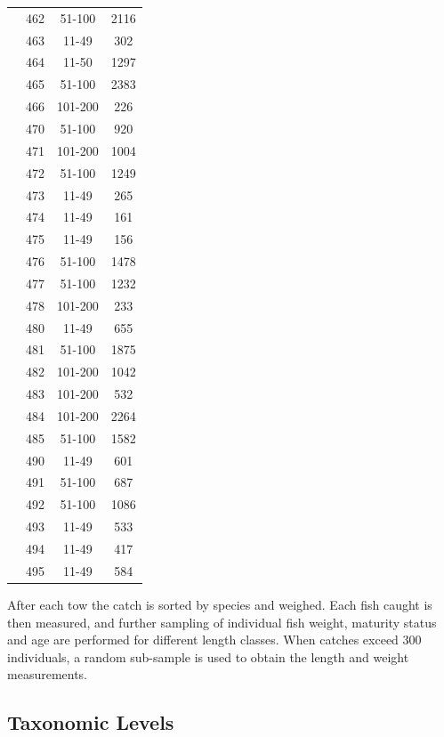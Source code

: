 \documentclass[12pt]{article}\usepackage[]{graphicx}\usepackage[]{color}
\begin{document}
\begin{longtable}[t]{cccc}
\nopagebreak
 & 462 & 51-100 & 2116\\
\nopagebreak
 & 463 & 11-49 & 302\\
\nopagebreak
 & 464 & 11-50 & 1297\\
\nopagebreak
 & 465 & 51-100 & 2383\\
\nopagebreak
\multirow{-24}{*}{\centering\arraybackslash 4VsW} & 466 & 101-200 & 226\\
\cmidrule{1-4}\pagebreak[0]
 & 470 & 51-100 & 920\\
\nopagebreak
 & 471 & 101-200 & 1004\\
\nopagebreak
 & 472 & 51-100 & 1249\\
\nopagebreak
 & 473 & 11-49 & 265\\
\nopagebreak
 & 474 & 11-49 & 161\\
\nopagebreak
 & 475 & 11-49 & 156\\
\nopagebreak
 & 476 & 51-100 & 1478\\
\nopagebreak
 & 477 & 51-100 & 1232\\
\nopagebreak
 & 478 & 101-200 & 233\\
\nopagebreak
 & 480 & 11-49 & 655\\
\nopagebreak
 & 481 & 51-100 & 1875\\
\nopagebreak
 & 482 & 101-200 & 1042\\
\nopagebreak
 & 483 & 101-200 & 532\\
\nopagebreak
 & 484 & 101-200 & 2264\\
\nopagebreak
 & 485 & 51-100 & 1582\\
\nopagebreak
 & 490 & 11-49 & 601\\
\nopagebreak
 & 491 & 51-100 & 687\\
\nopagebreak
 & 492 & 51-100 & 1086\\
\nopagebreak
 & 493 & 11-49 & 533\\
\nopagebreak
 & 494 & 11-49 & 417\\
\nopagebreak
\multirow{-21}{*}{\centering\arraybackslash 4X} & 495 & 11-49 & 584\\*
\end{longtable}
After each tow the catch is sorted by species and weighed. Each fish caught is then measured, and further sampling of individual fish weight, maturity status and age are performed for different length classes. When catches exceed 300 individuals, a random sub-sample is used to obtain the length and weight measurements.

\hypertarget{taxo}{%
\subsection{Taxonomic Levels}\label{taxo}}
\end{document}
